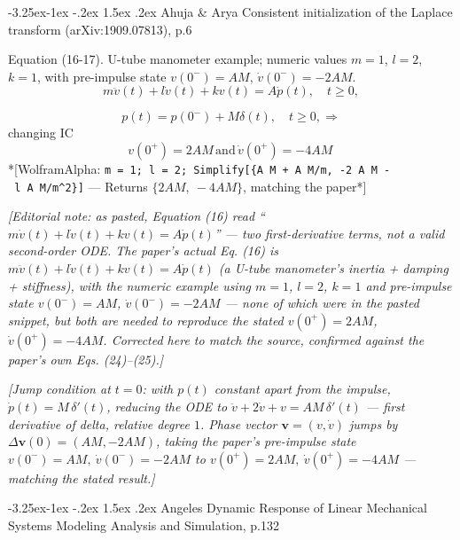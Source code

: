 \documentclass[
  11pt,
]{article}
\makeatletter
\providecommand{\implies}{\Longrightarrow}
\renewcommand\paragraph{\@startsection{paragraph}{4}{\z@}%
                                     {-3.25ex\@plus -1ex \@minus -.2ex}%
                                     {1.5ex \@plus .2ex}%
                                     {\normalfont\normalsize\bfseries}}
\makeatother
\begin{document}
\hypertarget{ahuja-arya-consistent-initialization-of-the-laplace-transform-arxiv1909.07813-p.6}{%
\paragraph{Ahuja \& Arya Consistent initialization of the Laplace
transform (arXiv:1909.07813),
p.6}\label{ahuja-arya-consistent-initialization-of-the-laplace-transform-arxiv1909.07813-p.6}}

Equation (16-17). U-tube manometer example; numeric values \(m=1\),
\(l=2\), \(k=1\), with pre-impulse state \(v(0^-)=AM\),
\(\dot v(0^-)=-2AM\).
\[m\ddot{v}(t) + l\dot{v}(t) + kv(t) = A\dot{p}(t), \quad t \geq 0,\]

\[ p(t) = p(0^-) + M \delta(t), \quad t \geq 0, 
\implies\] changing IC
\[v(0^+) = 2AM \, \text{and} \, \dot{v}(0^+) = -4AM \, \]
*{[}WolframAlpha:
\texttt{m\ =\ 1;\ l\ =\ 2;\ Simplify{[}\{A\ M\ +\ A\ M/m,\ -2\ A\ M\ -\ l\ A\ M/m\^{}2\}{]}}
--- Returns \(\{2AM,\ -4AM\}\), matching the paper*{]}

\emph{{[}Editorial note: as pasted, Equation (16) read
``\(m\dot v(t)+l\dot v(t)+kv(t)=A\dot p(t)\)'' --- two first-derivative
terms, not a valid second-order ODE. The paper's actual Eq. (16) is
\(m\ddot v(t)+l\dot v(t)+kv(t)=A\dot p(t)\) (a U-tube manometer's
inertia + damping + stiffness), with the numeric example using \(m=1\),
\(l=2\), \(k=1\) and pre-impulse state \(v(0^-)=AM\),
\(\dot v(0^-)=-2AM\) --- none of which were in the pasted snippet, but
both are needed to reproduce the stated \(v(0^+)=2AM\),
\(\dot v(0^+)=-4AM\). Corrected here to match the source, confirmed
against the paper's own Eqs. (24)--(25).{]}}

\emph{{[}Jump condition at \(t=0\): with \(p(t)\) constant apart from
the impulse, \(\dot p(t)=M\,\delta'(t)\), reducing the ODE to
\(\ddot v+2\dot v+v=AM\,\delta'(t)\) --- first derivative of delta,
relative degree \(1\). Phase vector \(\mathbf v=(v,\dot v)\) jumps by
\(\Delta\mathbf v(0)=(AM,-2AM)\), taking the paper's pre-impulse state
\(v(0^-)=AM,\ \dot v(0^-)=-2AM\) to \(v(0^+)=2AM,\ \dot v(0^+)=-4AM\)
--- matching the stated result.{]}}

\hypertarget{angeles-dynamic-response-of-linear-mechanical-systems-modeling-analysis-and-simulation-p.132}{%
\paragraph{Angeles Dynamic Response of Linear Mechanical Systems
Modeling Analysis and Simulation,
p.132}\label{angeles-dynamic-response-of-linear-mechanical-systems-modeling-analysis-and-simulation-p.132}}
\end{document}

